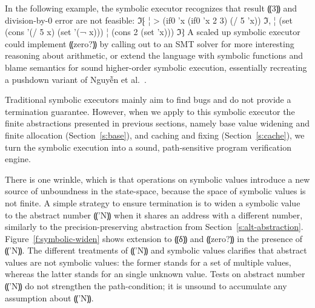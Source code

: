 In the following example, the symbolic executor recognizes that result ⸨3⸩ and
division-by-0 error are not feasible:
ℑ⁅
¦ > (if0 'x (if0 'x 2 3) (/ 5 'x))
ℑ,
¦ (set (cons '(/ 5 x) (set '(¬ x)))
¦      (cons 2 (set 'x)))
ℑ⁆
A scaled up symbolic executor could implement ⸨zero?⸩ by calling out
to an SMT solver for more interesting reasoning about arithmetic, or
extend the language with symbolic functions and blame semantics for
sound higher-order symbolic execution, essentially recreating a
pushdown variant of Nguyễn et
al.~\cite{dvanhorn:TobinHochstadt2012Higherorder,dvanhorn:Nguyen2014Soft,dvanhorn:Nguyen2015Relatively}.

\newcommand{\lamif}{«λ⦑IF⦒» }


Traditional symbolic executors mainly aim to find bugs and do not
provide a termination guarantee. However, when we apply to this
symbolic executor the finite abstractions presented in previous
sections, namely base value widening and finite allocation
(Section~\ref{s:base}), and caching and fixing
(Section~\ref{s:cache}), we turn the symbolic execution into a sound,
path-sensitive program verification engine.

There is one wrinkle, which is that operations on symbolic values
introduce a new source of unboundness in the state-space, because the
space of symbolic values is not finite. A simple strategy to ensure
termination is to widen a symbolic value to the abstract number ⸨'N⸩
when it shares an address with a different number, similarly to the
precision-preserving abstraction from
Section~\ref{s:alt-abstraction}. Figure~\ref{f:symbolic-widen} shows
extension to ⸨δ⸩ and ⸨zero?⸩ in the presence of ⸨'N⸩. The different
treatments of ⸨'N⸩ and symbolic values clarifies that abstract values
are not symbolic values: the former stands for a set of multiple
values, whereas the latter stands for an single unknown value. Tests
on abstract number ⸨'N⸩ do not strengthen the path-condition; it is
unsound to accumulate any assumption about ⸨'N⸩.

